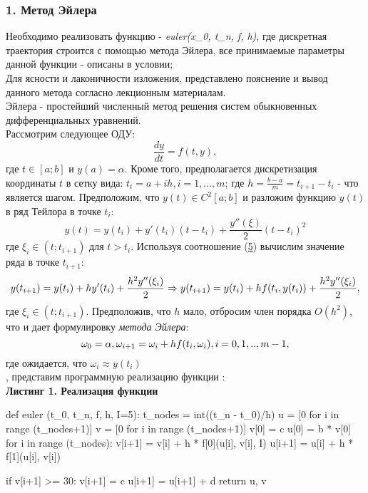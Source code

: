 \subsubsection{1. Метод Эйлера}
\hspace*{\parindent}Необходимо реализовать функцию 
- \textit{euler(x_0, t_n, f, h)},  где дискретная траектория строится с помощью метода Эйлера, все принимаемые параметры данной функции - описаны в условии; \\
Для ясности и лаконичности изложения, представлено пояснение и вывод данного метода согласно лекционным материалам. \\
 Эйлера - простейший численный метод решения систем обыкновенных дифференциальных уравнений. \\
Рассмотрим следующее ОДУ:
\begin{equation}
    \frac{dy}{dt}=f(t,y),
\end{equation}
где $t \in [a; b]$ и $y(a) = \alpha$. Кроме того, предполагается дискретизация координаты $t$ в сетку вида: $t_i = a + ih, i = 1,..., m$; где $h=\frac{b-a}{m}=t_{i+1}-t_i$ - что является шагом. Предположим, что $y(t) \in C^2[a;b]$ и разложим функцию $y(t)$ в ряд Тейлора в точке $t_i$:
\hypertarget{res1}{}
\begin{equation}
    y(t) = y(t_i)+y'(t_i)(t-t_i)+\frac{y''(\xi)}{2}(t-t_i)^2
\end{equation}
где $\xi_i \in (t;t_{i+1})$ для $t > t_i$. Используя соотношение (\hyperlink{res1}{5}) вычислим значение ряда в точке $t_{i+1}$:
\hypertarget{res5}{}
\begin{equation}
    y(t_{i+1}) = y(t_i)+hy'(t_i)+\frac{h^2y''(\xi_i)}{2} \\
    \Rightarrow y(t_{i+1}) = y(t_i)+hf(t_i,y(t_i))+\frac{h^2y''(\xi_i)}{2} ,
\end{equation}
где $\xi_i \in (t; t_{i+1})$. Предположив, что $h$ мало, отбросим член порядка $O(h^2)$, что и дает формулировку
\textit{метода Эйлера}: 
\hypertarget{res2}{}
\begin{equation}
     \omega_0 = \alpha, \\
     \omega_{i+1} = \omega_i + hf(t_i, \omega_i), i = 0, 1,.., m-1,
\end{equation}
где ожидается, что $\omega_i \approx y(t_i)$
\\
, представим программную реализацию функции :\\
\textbf{Листинг 1. Реализация функции }
\hypertarget{lst1}{}
\begin{python}
def euler (t_0, t_n, f, h, I=5):
  t_nodes = int((t_n - t_0)/h)
  u = [0 for i in range (t_nodes+1)]
  v = [0 for i in range (t_nodes+1)]
  v[0] = c
  u[0] = b * v[0]
  for i in range (t_nodes):
    v[i+1] = v[i] + h * f[0](u[i], v[i], I)
    u[i+1] = u[i] + h * f[1](u[i], v[i])

    if v[i+1] >= 30:
      v[i+1] = c
      u[i+1] = u[i+1] + d
  return u, v
\end{python}
